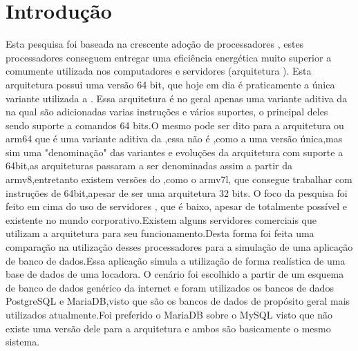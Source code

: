 \documentclass[
	12pt,				%
	openright,			%
	oneside,			%
	a4paper,			%
	english,			%
	french,				%
	spanish,			%
	brazil,				%
	]{abntex2}
\begin{document}
\tableofcontents*

\textual
\setcounter{page}{1}
\chapter*{Introdução}
\label{ch:introducao}
Esta pesquisa foi baseada na crescente adoção de processadores , estes processadores conseguem entregar uma eficiência energética muito superior a comumente utilizada nos computadores e servidores (arquitetura ). Esta arquitetura possui uma versão 64 bit, que hoje em dia é praticamente a única variante utilizada a . Essa arquitetura é no geral apenas uma variante aditiva da  na qual são adicionadas varias instruções e vários suportes, o principal deles sendo suporte a comandos 64 bits.O mesmo pode ser dito para a arquitetura  ou arm64 que é uma variante aditiva da ,essa não é ,como a  uma versão única,mas sim uma "denominação" das variantes e evoluções da arquitetura  com suporte a 64bit,as arquiteturas passaram a ser denominadas assim a partir da armv8,entretanto existem versões do ,como o armv7l, que consegue trabalhar com instruções de 64bit,apesar de ser uma arquitetura 32 bits.\newline
O foco da pesquisa foi feito em cima do uso de servidores , que é baixo, apesar de totalmente possível e existente no mundo corporativo.Existem alguns servidores comerciais que utilizam a arquitetura  para seu funcionamento.Desta forma foi feita uma comparação na utilização desses processadores para a simulação de uma aplicação de banco de dados.Essa aplicação simula a utilização de forma realística de uma base de dados de uma locadora. \newline
O cenário foi escolhido a partir de um esquema de banco de dados genérico da internet e foram utilizados os bancos de dados PostgreSQL e MariaDB,visto que são os bancos de dados de propósito geral mais utilizados atualmente.Foi preferido o MariaDB sobre o MySQL visto que não existe uma versão dele para a arquitetura  e ambos são basicamente o mesmo sistema.\newline
\end{document}
